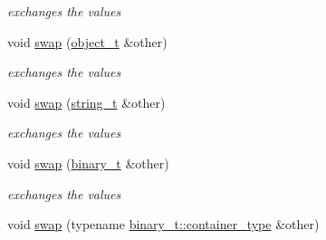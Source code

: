 \begin{DoxyCompactItemize}
\begin{DoxyCompactList}\small\item\em exchanges the values \end{DoxyCompactList}\item 
void \hyperlink{classnlohmann_1_1basic__json_a57b86bdcfc55557dacc36969adb0417e}{swap} (\hyperlink{classnlohmann_1_1basic__json_a5e3df077f880583a96d74cd63e173cb2}{object\+\_\+t} \&other)
\begin{DoxyCompactList}\small\item\em exchanges the values \end{DoxyCompactList}\item 
void \hyperlink{classnlohmann_1_1basic__json_aac916df9561daf4eaf2372119fe91899}{swap} (\hyperlink{classnlohmann_1_1basic__json_a33593865ffb1860323dcbd52425b90c8}{string\+\_\+t} \&other)
\begin{DoxyCompactList}\small\item\em exchanges the values \end{DoxyCompactList}\item 
void \hyperlink{classnlohmann_1_1basic__json_aa242e339ebc7583e114f2167a83f8c90}{swap} (\hyperlink{classnlohmann_1_1basic__json_ad6c955145bebde84d93991ffed7cd389}{binary\+\_\+t} \&other)
\begin{DoxyCompactList}\small\item\em exchanges the values \end{DoxyCompactList}\item 
void \hyperlink{classnlohmann_1_1basic__json_a749a1f5091a5e63ccfe919e0aef986af}{swap} (typename \hyperlink{classnlohmann_1_1byte__container__with__subtype_a4d27e8633c5a5e3b49dd4ccb06515713}{binary\+\_\+t\+::container\+\_\+type} \&other)
\end{DoxyCompactItemize}
